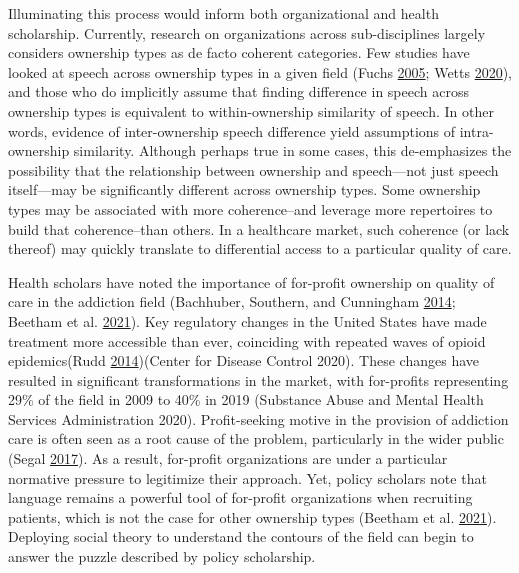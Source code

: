 \documentclass[
  12pt,
]{article}
\begin{document}
\vspace{12pt}

Illuminating this process would inform both organizational and health scholarship. Currently, research on organizations across sub-disciplines largely considers ownership types as de facto coherent categories. Few studies have looked at speech across ownership types in a given field (Fuchs \protect\hyperlink{ref-fuchs2005}{2005}; Wetts \protect\hyperlink{ref-wetts2020}{2020}), and those who do implicitly assume that finding difference in speech across ownership types is equivalent to within-ownership similarity of speech. In other words, evidence of inter-ownership speech difference yield assumptions of intra-ownership similarity. Although perhaps true in some cases, this de-emphasizes the possibility that the relationship between ownership and speech---not just speech itself---may be significantly different across ownership types. Some ownership types may be associated with more coherence--and leverage more repertoires to build that coherence--than others. In a healthcare market, such coherence (or lack thereof) may quickly translate to differential access to a particular quality of care.

\vspace{12pt}

Health scholars have noted the importance of for-profit ownership on quality of care in the addiction field (Bachhuber, Southern, and Cunningham \protect\hyperlink{ref-bachhuber2014}{2014}; Beetham et al. \protect\hyperlink{ref-beetham2021}{2021}). Key regulatory changes in the United States have made treatment more accessible than ever, coinciding with repeated waves of opioid epidemics(Rudd \protect\hyperlink{ref-rudd2014}{2014})(Center for Disease Control 2020). These changes have resulted in significant transformations in the market, with for-profits representing 29\% of the field in 2009 to 40\% in 2019 (Substance Abuse and Mental Health Services Administration 2020). Profit-seeking motive in the provision of addiction care is often seen as a root cause of the problem, particularly in the wider public (Segal \protect\hyperlink{ref-segal2017}{2017}). As a result, for-profit organizations are under a particular normative pressure to legitimize their approach. Yet, policy scholars note that language remains a powerful tool of for-profit organizations when recruiting patients, which is not the case for other ownership types (Beetham et al. \protect\hyperlink{ref-beetham2021}{2021}). Deploying social theory to understand the contours of the field can begin to answer the puzzle described by policy scholarship.
\end{document}
